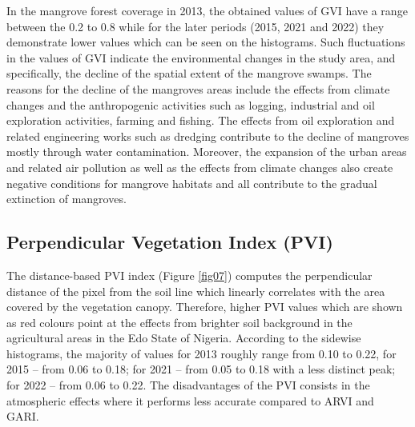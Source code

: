 \documentclass[jmse,article,submit,pdftex,moreauthors]{Definitions/mdpi}
\begin{document}
In the mangrove forest coverage in 2013, the obtained values of GVI have a range between the 0.2 to 0.8 while for the later periods (2015, 2021 and 2022) they demonstrate lower values which can be seen on the histograms. Such fluctuations in the values of GVI indicate the environmental changes in the study area, and specifically, the decline of the spatial extent of the mangrove swamps. The reasons for the decline of the mangroves areas include the effects from climate changes and the anthropogenic activities such as logging, industrial and oil exploration activities, farming and fishing. The effects from oil exploration and related engineering works such as dredging contribute to the decline of mangroves mostly through water contamination. Moreover, the expansion of the urban areas and related air pollution as well as the effects from climate changes also create negative conditions for mangrove habitats and all contribute to the gradual extinction of mangroves.


\subsection{Perpendicular Vegetation Index (PVI)}

The distance-based PVI index (Figure \ref{fig07}) computes the perpendicular distance of the pixel from the soil line which linearly correlates with the area covered by the vegetation canopy. Therefore, higher PVI values which are shown as red colours point at the effects from brighter soil background in the agricultural areas in the Edo State of Nigeria. According to the sidewise histograms, the majority of values for 2013 roughly range from 0.10 to 0.22, for 2015 -- from 0.06 to 0.18; for 2021 -- from 0.05 to 0.18 with a less distinct peak; for 2022 -- from 0.06 to 0.22. The disadvantages of the PVI consists in the atmospheric effects where it performs less accurate compared to ARVI and GARI. 
\end{document}
